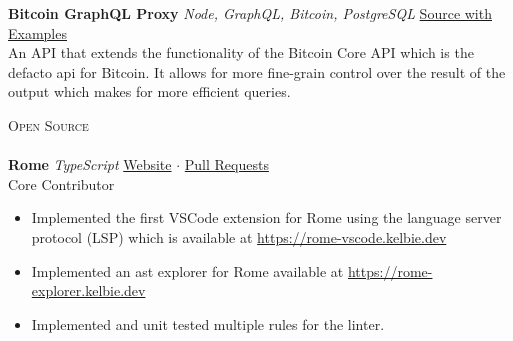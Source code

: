 \documentclass[a4paper]{article}
\newcommand{\lineunder} {
    \vspace*{-8pt} \\
    \hspace*{-18pt} \hrulefill \\
}
\newcommand{\header} [1] {
    {\hspace*{-18pt}\vspace*{6pt} \textsc{#1}}
    \vspace*{-6pt} \lineunder
}
\begin{document}
{\textbf{Bitcoin GraphQL Proxy}} {\sl Node, GraphQL, Bitcoin, PostgreSQL} \hfill \href{https://github.com/Kelbie/bitcoin-graphql}{Source with Examples} \\
An API that extends the functionality of the Bitcoin Core API which is the defacto api for Bitcoin. It allows for more fine-grain control over the result of the output which makes for more efficient queries.\
\vspace*{2mm}




\header{Open Source}
\textbf{Rome}  {\sl TypeScript} \hfill \href{https://romefrontend.dev/}{Website} $\cdot$  \href{https://github.com/romefrontend/rome/pulls?q=is\%3Apr+is\%3Amerged+author\%3AKelbie}{Pull Requests} \\
Core Contributor\\
\vspace*{-1mm}
\begin{itemize} \itemsep 1pt
	\item Implemented the first VSCode extension for Rome using the language server protocol (LSP) which is available at \href{https://rome-vscode.kelbie.dev}{https://rome-vscode.kelbie.dev}
	\item Implemented an ast explorer for Rome available at \href{https://rome-explorer.kelbie.dev}{https://rome-explorer.kelbie.dev}
	\item Implemented and unit tested multiple rules for the linter.
\end{itemize}
\vspace*{2mm}
\end{document}
